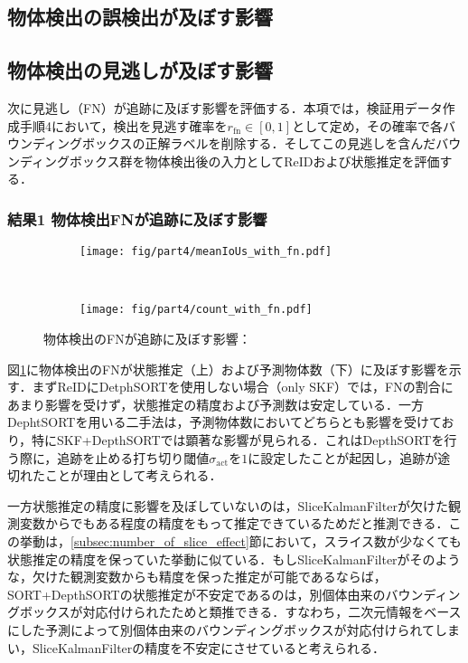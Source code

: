     \subsection{物体検出の誤検出が及ぼす影響}
    \label{subsec:FPeffect}

    \subsection{物体検出の見逃しが及ぼす影響}
    \label{subsec:FNeffect}

    次に見逃し（FN）が追跡に及ぼす影響を評価する．本項では，検証用データ作成手順4において，検出を見逃す確率を$r_{\text{fn}} \in [0, 1]$として定め，その確率で各バウンディングボックスの正解ラベルを削除する．そしてこの見逃しを含んだバウンディングボックス群を物体検出後の入力としてReIDおよび状態推定を評価する．

        \subsubsection{結果1 物体検出FNが追跡に及ぼす影響}

        \begin{figure}[t]
            \begin{subfigure}[t]{\linewidth}
                \centering
                \texttt{[image: fig/part4/meanIoUs\_with\_fn.pdf]}
            \end{subfigure}
            \\
            \begin{subfigure}[t]{\linewidth}
                \centering
                \texttt{[image: fig/part4/count\_with\_fn.pdf]}
            \end{subfigure}
            \caption[物体検出のFNが追跡に及ぼす影響]{物体検出のFNが追跡に及ぼす影響：}
            \label{fig:FN_effect}
        \end{figure}

        図\ref{fig:FN_effect}に物体検出のFNが状態推定（上）および予測物体数（下）に及ぼす影響を示す．まずReIDにDetphSORTを使用しない場合（only SKF）では，FNの割合にあまり影響を受けず，状態推定の精度および予測数は安定している．一方DephtSORTを用いる二手法は，予測物体数においてどちらとも影響を受けており，特にSKF+DepthSORTでは顕著な影響が見られる．これはDepthSORTを行う際に，追跡を止める打ち切り閾値$\sigma_{\text{act}}$を$1$に設定したことが起因し，追跡が途切れたことが理由として考えられる．

        一方状態推定の精度に影響を及ぼしていないのは，SliceKalmanFilterが欠けた観測変数からでもある程度の精度をもって推定できているためだと推測できる．この挙動は，\ref{subsec:number_of_slice_effect}節において，スライス数が少なくても状態推定の精度を保っていた挙動に似ている．もしSliceKalmanFilterがそのような，欠けた観測変数からも精度を保った推定が可能であるならば，SORT+DepthSORTの状態推定が不安定であるのは，別個体由来のバウンディングボックスが対応付けられたためと類推できる．すなわち，二次元情報をベースにした予測によって別個体由来のバウンディングボックスが対応付けられてしまい，SliceKalmanFilterの精度を不安定にさせていると考えられる．

